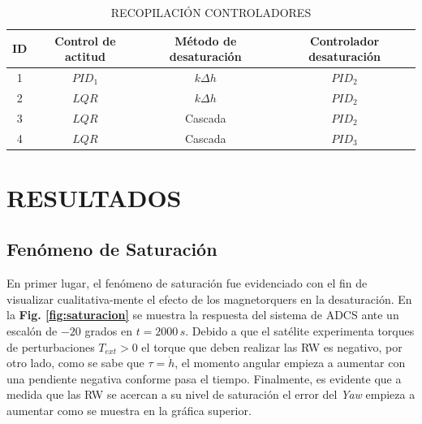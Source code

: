 \begin{table}[h]
	\caption{\MakeUppercase{Recopilación Controladores}}
	\begin{center}
		\begin{tabular}{ c c c c}
			
			ID&  \textbf{Control de actitud} &  \textbf{ Método de desaturación} & \textbf{Controlador desaturación}\\ \hline
			1 &  $PID_1$ & $k\Delta h$ & $PID_2$\\ 
			2 &  $LQR$ & $k\Delta h$ & $PID_2$\\ 
			3 &  $LQR$ & Cascada & $PID_2$\\ 
			4 &  $LQR$ & Cascada  & $PID_3$\\  \hline			
		\end{tabular}
	\end{center}
	\label{table:summary_controllers}
\end{table}
\newpage

\section{RESULTADOS}
\subsection{Fenómeno de Saturación}

En primer lugar, el fenómeno de saturación fue evidenciado con el fin de visualizar cualitativa-mente el efecto de los magnetorquers en la desaturación. En la \textbf{Fig. \ref{fig:saturacion}} se muestra la respuesta del sistema de ADCS ante un escalón de $-20$ grados en $t=2000\,s$. Debido a que el satélite experimenta torques de perturbaciones $T_{ext} >0$ el torque que deben realizar las RW es negativo, por otro lado, como se sabe que $\tau = \dot{h}$, el momento angular empieza a aumentar con una pendiente negativa conforme pasa el tiempo. Finalmente, es evidente que a medida que las RW se acercan a su nivel de saturación el error del \textit{Yaw} empieza a aumentar como se muestra en la gráfica superior.

